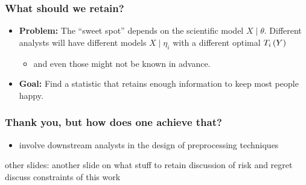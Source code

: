 \documentclass[10pt, compress]{beamer}
\begin{document}
\begin{frame}[fragile]
    \frametitle{What should we retain?}
    \begin{itemize}
    	\item \textbf{Problem:} The “sweet spot” depends on the scientific model $X \mid \theta$. Different analysts will have different models $X \mid \eta_i$ with a different optimal $T_i\del{Y}$
    		\begin{itemize}
    			\item and even those might not be known in advance.
    		\end{itemize}
    	\item \textbf{Goal:} Find a statistic that retains enough information to keep most people happy.
    \end{itemize}
\end{frame}
\begin{frame}[fragile]
    \frametitle{Thank you, but how does one achieve that?}
    \begin{itemize}
    	\item involve downstream analysts in the design of preprocessing techniques
    \end{itemize}
\end{frame}

\begin{frame}[fragile]

    other slides:
    another slide on what stuff to retain
    discussion of risk and regret
    discuss constraints of this work


\end{frame}
\end{document}
